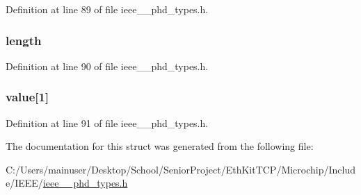 Definition at line 89 of file ieee\+\_\+\_\+phd\+\_\+types.\+h.

\hypertarget{struct___attribute_list_a3743679e4ff85e3e1b3fc2e59973fbb3}{}
\subsubsection[{length}]{ length}\label{struct___attribute_list_a3743679e4ff85e3e1b3fc2e59973fbb3}


Definition at line 90 of file ieee\+\_\+\_\+phd\+\_\+types.\+h.

\hypertarget{struct___attribute_list_ac820964129e6a9908a0bca883f165d83}{}
\subsubsection[{value}]{ value\mbox{[}1\mbox{]}}\label{struct___attribute_list_ac820964129e6a9908a0bca883f165d83}


Definition at line 91 of file ieee\+\_\+\_\+phd\+\_\+types.\+h.



The documentation for this struct was generated from the following file\+:\begin{DoxyCompactItemize}
\item 
C\+:/\+Users/mainuser/\+Desktop/\+School/\+Senior\+Project/\+Eth\+Kit\+T\+C\+P/\+Microchip/\+Include/\+I\+E\+E\+E/\hyperlink{ieee__11073__phd__types_8h}{ieee\+\_\+\_\+phd\+\_\+types.\+h}\end{DoxyCompactItemize}
